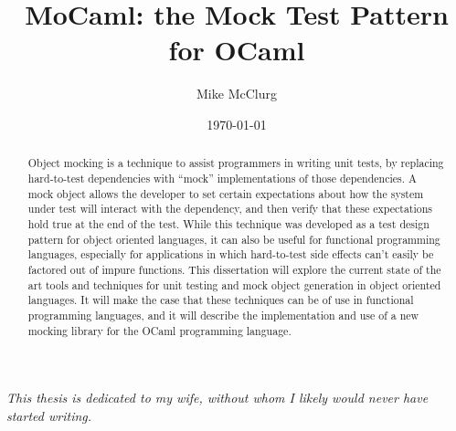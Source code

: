 \documentclass[dissertation]{softeng}
\title{MoCaml: the Mock Test Pattern for OCaml}
\author{Mike McClurg}
\date{\today}
\begin{document}
\maketitle

\begin{abstract}

  Object mocking is a technique to assist programmers in writing unit
  tests, by replacing hard-to-test dependencies with ``mock''
  implementations of those dependencies. A mock object allows the
  developer to set certain expectations about how the system under
  test will interact with the dependency, and then verify that these
  expectations hold true at the end of the test. While this technique
  was developed as a test design pattern for object oriented
  languages, it can also be useful for functional programming
  languages, especially for applications in which hard-to-test side
  effects can't easily be factored out of impure functions. This
  dissertation will explore the current state of the art tools and
  techniques for unit testing and mock object generation in object
  oriented languages. It will make the case that these techniques can
  be of use in functional programming languages, and it will describe
  the implementation and use of a new mocking library for the OCaml
  programming language.


\end{abstract}

\newpage


\vspace*{\fill}
\begin{centering}
  \textit{This thesis is dedicated to my wife, without whom I likely
    would never have started writing.}
\end{centering}
\vspace*{\fill}

\newpage

\tableofcontents

\newpage

\listoffigures








\end{document}
